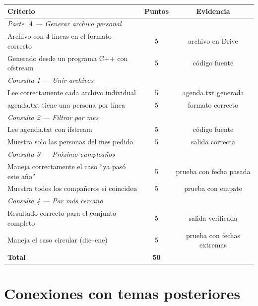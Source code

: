 \documentclass[12pt, oneside]{article}
\begin{document}
\begin{center}
\begin{tabular}{p{7.5cm}cc}
  \toprule
  \textbf{Criterio} & \textbf{Puntos} & \textbf{Evidencia} \\
  \midrule
  \multicolumn{3}{l}{\textit{Parte~A — Generar archivo personal}} \\
  \quad Archivo con 4 líneas en el formato correcto  & 5 & archivo en Drive \\
  \quad Generado desde un programa C++ con ofstream  & 5 & código fuente \\
  \midrule
  \multicolumn{3}{l}{\textit{Consulta 1 — Unir archivos}} \\
  \quad Lee correctamente cada archivo individual     & 5 & agenda.txt generada \\
  \quad agenda.txt tiene una persona por línea        & 5 & formato correcto \\
  \midrule
  \multicolumn{3}{l}{\textit{Consulta 2 — Filtrar por mes}} \\
  \quad Lee agenda.txt con ifstream                   & 5 & código fuente \\
  \quad Muestra solo las personas del mes pedido      & 5 & salida correcta \\
  \midrule
  \multicolumn{3}{l}{\textit{Consulta 3 — Próximo cumpleaños}} \\
  \quad Maneja correctamente el caso ``ya pasó este año'' & 5 & prueba con fecha pasada \\
  \quad Muestra todos los compañeros si coinciden      & 5 & prueba con empate \\
  \midrule
  \multicolumn{3}{l}{\textit{Consulta 4 — Par más cercano}} \\
  \quad Resultado correcto para el conjunto completo   & 5 & salida verificada \\
  \quad Maneja el caso circular (dic--ene)             & 5 & prueba con fechas extremas \\
  \midrule
  \textbf{Total}                                       & \textbf{50} & \\
  \bottomrule
\end{tabular}
\end{center}

\section{Conexiones con temas posteriores}
\end{document}
